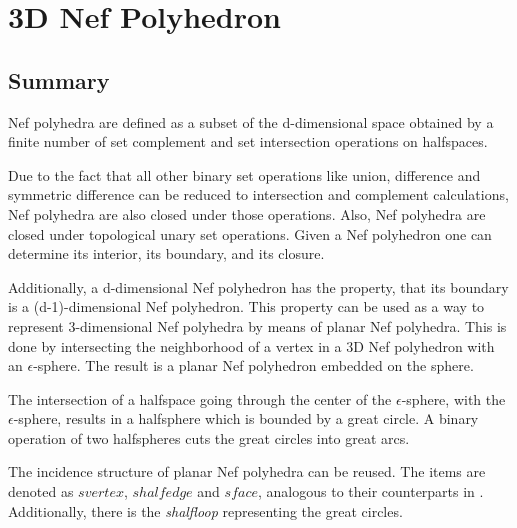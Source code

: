 
\clearpage
\chapter{3D Nef Polyhedron}
\label{chapterNefpolyhedronRef}

\section*{Summary}

Nef polyhedra are defined as a subset of the d-dimensional space obtained by
a finite number of set complement and set intersection operations on
halfspaces. 

Due to the fact that all other binary set operations like union,
difference and symmetric difference can be reduced to intersection and
complement calculations, Nef polyhedra are also closed under those
operations. Also, Nef polyhedra are closed under topological unary 
set operations. Given a Nef polyhedron one can determine its interior, its
boundary, and its closure.

Additionally, a d-dimensional Nef polyhedron has the property, that its boundary
is a (d-1)-dimensional Nef polyhedron. This property can be used as a way to
represent 3-dimensional Nef polyhedra by means of planar Nef polyhedra.
This is done by intersecting the neighborhood of a vertex in a 3D Nef polyhedron
with an $\epsilon$-sphere. The result is a planar Nef polyhedron embedded
on the sphere.

The intersection of a halfspace going through the center of the $\epsilon$-sphere,
with the $\epsilon$-sphere, results in a halfsphere which is bounded by
a great circle. A binary operation of two halfspheres cuts the great circles
into great arcs.

The incidence structure of planar Nef polyhedra can be reused. The items
are denoted as $svertex$, $shalfedge$ and $sface$, analogous 
to their counterparts in . Additionally, there is the
\emph{shalfloop} representing the great circles.

